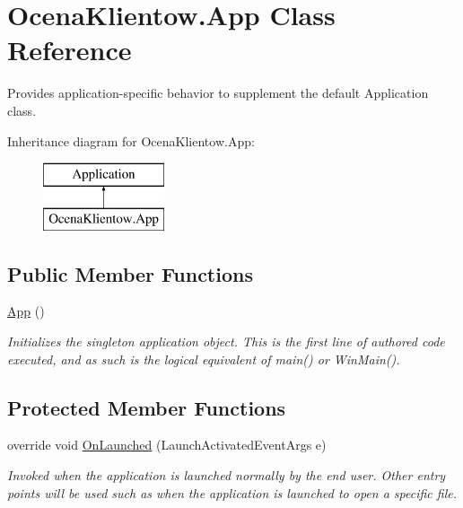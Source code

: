 \hypertarget{class_ocena_klientow_1_1_app}{}\section{Ocena\+Klientow.\+App Class Reference}
\label{class_ocena_klientow_1_1_app}


Provides application-\/specific behavior to supplement the default Application class.  


Inheritance diagram for Ocena\+Klientow.\+App\+:\begin{figure}[H]
\begin{center}
\leavevmode
\includegraphics[height=2.000000cm]{class_ocena_klientow_1_1_app}
\end{center}
\end{figure}
\subsection*{Public Member Functions}
\begin{DoxyCompactItemize}
\item 
\hyperlink{class_ocena_klientow_1_1_app_aaa6fd2cd9f738801f10c33e457a35b13}{App} ()
\begin{DoxyCompactList}\small\item\em Initializes the singleton application object. This is the first line of authored code executed, and as such is the logical equivalent of main() or Win\+Main(). \end{DoxyCompactList}\end{DoxyCompactItemize}
\subsection*{Protected Member Functions}
\begin{DoxyCompactItemize}
\item 
override void \hyperlink{class_ocena_klientow_1_1_app_a33fc9fabfa1a461d87dadafec0ea9a56}{On\+Launched} (Launch\+Activated\+Event\+Args e)
\begin{DoxyCompactList}\small\item\em Invoked when the application is launched normally by the end user. Other entry points will be used such as when the application is launched to open a specific file. \end{DoxyCompactList}\end{DoxyCompactItemize}



